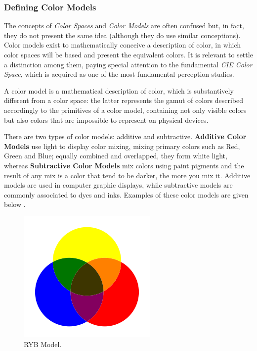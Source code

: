 \subsubsection{Defining Color Models}		%
%
The concepts of \emph{Color Spaces} and \emph{Color Models} are often confused but, in fact, they do not present the same idea
(although they do use similar conceptions). Color models exist to mathematically conceive a description of color,
in which color spaces will be based and present the equivalent colors. It is relevant to settle a distinction among
them, paying special attention to the fundamental \emph{CIE Color Space}, which is acquired as one of the most
fundamental perception studies. \par
%
A color model is a mathematical description of color, which is substantively different from a color space: the latter represents
the gamut of colors described accordingly to the primitives of a color model, containing not only visible colors
but also colors that are impossible to represent on physical devices. \par
There are two types of color models: additive and subtractive. \textbf{Additive Color Models} use light
to display color mixing, mixing primary colors such as Red, Green and Blue; equally combined and
overlapped, they form white light, whereas \textbf{Subtractive Color Models} mix colors using paint pigments
and the result of any mix is a color that tend to be darker, the more you mix it. Additive models are used
in computer graphic displays, while subtractive models are commonly associated to dyes and inks. Examples
of these color models are given below \cite{Ware2012}. \par
%
\begin{figure}
  \centering
  \vspace{-10pt}
  \includegraphics[width=\linewidth]{images/background/RYB.png}
  \caption[RYB Color Model Schematic]{RYB Model.\protect\footnotemark{}}
  \label{fig:RYB}
\end{figure}
%
